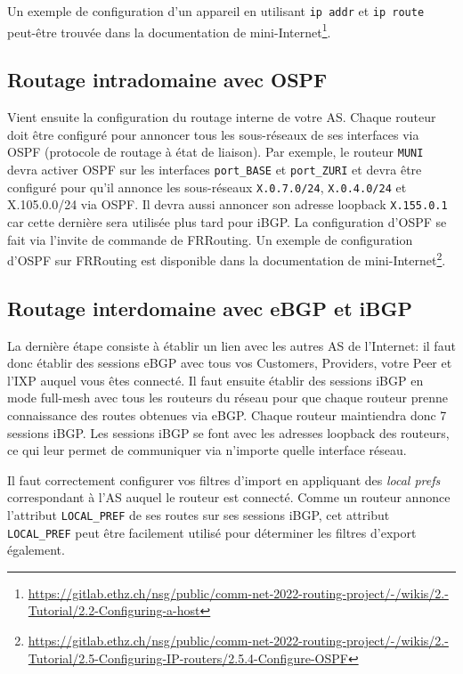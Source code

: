 \documentclass[a4paper, 11pt]{article}
\begin{document}
Un exemple de configuration d'un appareil en utilisant
\texttt{ip addr} et \texttt{ip route} peut-être trouvée dans la documentation
de mini-Internet\footnote{\url{https://gitlab.ethz.ch/nsg/public/comm-net-2022-routing-project/-/wikis/2.-Tutorial/2.2-Configuring-a-host}}.

\subsection{Routage intradomaine avec OSPF}

Vient ensuite la configuration du routage interne de votre AS.
Chaque routeur doit être configuré pour annoncer tous
les sous-réseaux de ses interfaces
via OSPF (protocole de routage à état de liaison).
Par exemple, le routeur \texttt{MUNI} devra activer
OSPF sur les interfaces \texttt{port\_BASE} et \texttt{port\_ZURI}
et devra être configuré
pour qu'il annonce les sous-réseaux \texttt{X.0.7.0/24},
\texttt{X.0.4.0/24} et X.105.0.0/24 via OSPF.
Il devra aussi annoncer son adresse loopback \texttt{X.155.0.1}
car cette dernière sera utilisée plus tard pour iBGP.
La configuration d'OSPF se fait via l'invite de commande de
FRRouting. Un exemple de configuration d'OSPF sur FRRouting
est disponible dans la documentation de
mini-Internet\footnote{\url{https://gitlab.ethz.ch/nsg/public/comm-net-2022-routing-project/-/wikis/2.-Tutorial/2.5-Configuring-IP-routers/2.5.4-Configure-OSPF}}.


\subsection{Routage interdomaine avec eBGP et iBGP}

La dernière étape consiste à établir un lien avec les autres AS
de l'Internet: il faut donc établir des sessions eBGP avec tous vos
Customers, Providers, votre Peer et l'IXP auquel vous êtes connecté.
Il faut ensuite établir des sessions iBGP en mode full-mesh avec 
tous les routeurs du réseau pour que chaque routeur prenne connaissance
des routes obtenues via eBGP. Chaque routeur maintiendra donc
7 sessions iBGP. Les sessions iBGP se font avec les adresses loopback
des routeurs, ce qui leur permet de communiquer via n'importe quelle
interface réseau.

Il faut correctement configurer vos filtres d'import en appliquant
des \textit{local prefs} correspondant à l'AS auquel le routeur est connecté.
Comme un routeur annonce l'attribut \texttt{LOCAL\_PREF} de ses routes
sur ses sessions iBGP, cet attribut \texttt{LOCAL\_PREF} peut être
facilement utilisé pour déterminer les filtres d'export également.
\end{document}
